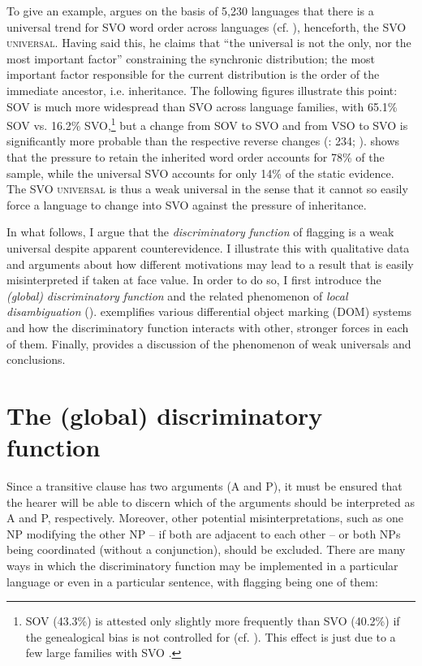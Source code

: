 \documentclass[output=paper]{langsci/langscibook}
\begin{document}
To give an example, \citet{Hammarström2015} argues on the basis of 5,230 languages that there is a universal trend for SVO word order across languages (cf. \citealt{Gell-MannRuhlen2011,MauritsGriffiths2014}), henceforth, the \textsc{SVO universal}. Having said this, he claims that “the universal is not the only, nor the most important factor” constraining the synchronic distribution; the most important factor responsible for the current distribution is the order of the immediate ancestor, i.e. inheritance. The following figures illustrate this point: SOV is much more widespread than SVO across language families, with 65.1\% SOV vs. 16.2\% SVO,\footnote{SOV (43.3\%) is attested only slightly more frequently than SVO (40.2\%) if the genealogical bias is not controlled for (cf. \citealt{Dryer2013_SOV}). This effect is just due to a few large families with SVO \citep{Hammarström2015}.} but a change from SOV to SVO and from VSO to SVO is significantly more probable than the respective reverse changes (\citealt{Croft2003}: 234; \citealt{MauritsGriffiths2014}). \citet{Hammarström2015} shows that the pressure to retain the inherited word order accounts for 78\% of the sample, while the universal SVO accounts for only 14\% of the static evidence. The SVO \textsc{universal} is thus a weak universal in the sense that it cannot so easily force a language to change into SVO against the pressure of inheritance.

In what follows, I argue that the \textit{discriminatory} \textit{function} of flagging is a weak universal despite apparent counterevidence. I illustrate this with qualitative data and arguments about how different motivations may lead to a result that is easily misinterpreted if taken at face value. In order to do so, I first introduce the \textit{(global)} \textit{discriminatory} \textit{function} and the related phenomenon of \textit{local} \textit{disambiguation} ().  exemplifies various differential object marking (DOM) systems and how the discriminatory function interacts with other, stronger forces in each of them. Finally,  provides a discussion of the phenomenon of weak universals and conclusions.

\section{The (global) discriminatory function}\label{sec:serzant:2}

Since a transitive clause has two arguments (A and P), it must be ensured that the hearer will be able to discern which of the arguments should be interpreted as A and P, respectively. Moreover, other potential misinterpretations, such as one NP modifying the other NP – if both are adjacent to each other – or both NPs being coordinated (without a conjunction), should be excluded. There are many ways in which the discriminatory function may be implemented in a particular language or even in a particular sentence, with flagging being one of them: 
\end{document}
